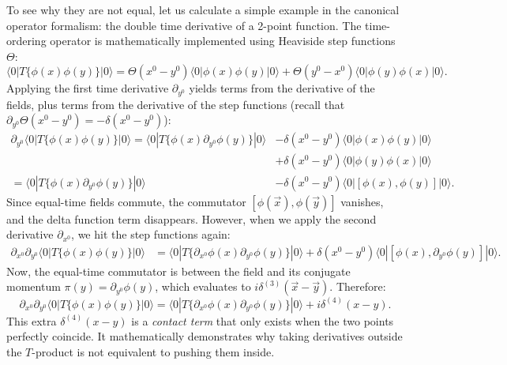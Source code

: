 To see why they are not equal, let us calculate a simple example in the canonical operator formalism: the double time derivative of a 2-point function. The time-ordering operator is mathematically implemented using Heaviside step functions $\Theta$:
\[
    \langle 0 | T \{ \phi(x) \phi(y) \} | 0 \rangle = \Theta(x^0 - y^0) \langle 0 | \phi(x) \phi(y) | 0 \rangle + \Theta(y^0 - x^0) \langle 0 | \phi(y) \phi(x) | 0 \rangle.
\]
Applying the first time derivative $\partial_{y^0}$ yields terms from the derivative of the fields, plus terms from the derivative of the step functions (recall that $\partial_{y^0} \Theta(x^0 - y^0) = -\delta(x^0 - y^0)$):
\[
    \begin{aligned}
        \partial_{y^0} \langle 0 | T \{ \phi(x) \phi(y) \} | 0 \rangle = \langle 0 | T \{ \phi(x) \partial_{y^0} \phi(y) \} | 0 \rangle & - \delta(x^0 - y^0) \langle 0 | \phi(x) \phi(y) | 0 \rangle       \\
                                                                                                                                        & + \delta(x^0 - y^0) \langle 0 | \phi(y) \phi(x) | 0 \rangle       \\
        = \langle 0 | T \{ \phi(x) \partial_{y^0} \phi(y) \} | 0 \rangle                                                                & - \delta(x^0 - y^0) \langle 0 | [ \phi(x), \phi(y) ] | 0 \rangle.
    \end{aligned}
\]
Since equal-time fields commute, the commutator $[\phi(\vec{x}), \phi(\vec{y})]$ vanishes, and the delta function term disappears. However, when we apply the second derivative $\partial_{x^0}$, we hit the step functions again:
\[
    \begin{aligned}
        \partial_{x^0} \partial_{y^0} \langle 0 | T \{ \phi(x) \phi(y) \} | 0 \rangle & = \langle 0 | T \{ \partial_{x^0} \phi(x) \partial_{y^0} \phi(y) \} | 0 \rangle + \delta(x^0 - y^0) \langle 0 | [ \phi(x), \partial_{y^0} \phi(y) ] | 0 \rangle.
    \end{aligned}
\]
Now, the equal-time commutator is between the field and its conjugate momentum $\pi(y) = \partial_{y^0} \phi(y)$, which evaluates to $i\delta^{(3)}(\vec{x}-\vec{y})$. Therefore:
\[
    \partial_{x^0} \partial_{y^0} \langle 0 | T \{ \phi(x) \phi(y) \} | 0 \rangle = \langle 0 | T \{ \partial_{x^0} \phi(x) \partial_{y^0} \phi(y) \} | 0 \rangle + i\delta^{(4)}(x - y).
\]
This extra $\delta^{(4)}(x - y)$ is a \textit{contact term} that only exists when the two points perfectly coincide. It mathematically demonstrates why taking derivatives outside the $T$-product is not equivalent to pushing them inside.

